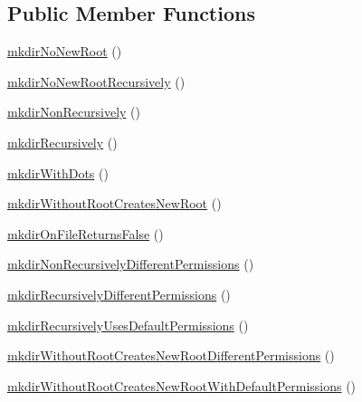 \subsection*{Public Member Functions}
\begin{DoxyCompactItemize}
\item 
\mbox{\hyperlink{classorg_1_1bovigo_1_1vfs_1_1vfs_stream_wrapper_mk_dir_test_case_a472b512da7f1358d4f03243da47422d0}{mkdir\+No\+New\+Root}} ()
\item 
\mbox{\hyperlink{classorg_1_1bovigo_1_1vfs_1_1vfs_stream_wrapper_mk_dir_test_case_af42ce413312ca7c8dc4a598ba148a31a}{mkdir\+No\+New\+Root\+Recursively}} ()
\item 
\mbox{\hyperlink{classorg_1_1bovigo_1_1vfs_1_1vfs_stream_wrapper_mk_dir_test_case_aa77ed864b8ff415a8d88597d8850232c}{mkdir\+Non\+Recursively}} ()
\item 
\mbox{\hyperlink{classorg_1_1bovigo_1_1vfs_1_1vfs_stream_wrapper_mk_dir_test_case_aae14c6d5af61495c3146496273a27914}{mkdir\+Recursively}} ()
\item 
\mbox{\hyperlink{classorg_1_1bovigo_1_1vfs_1_1vfs_stream_wrapper_mk_dir_test_case_a03f712ed8ee4cb7f24db9801ca8ca20e}{mkdir\+With\+Dots}} ()
\item 
\mbox{\hyperlink{classorg_1_1bovigo_1_1vfs_1_1vfs_stream_wrapper_mk_dir_test_case_a8878b08f86ffed3025203c9ab270905c}{mkdir\+Without\+Root\+Creates\+New\+Root}} ()
\item 
\mbox{\hyperlink{classorg_1_1bovigo_1_1vfs_1_1vfs_stream_wrapper_mk_dir_test_case_a65e6c6241ad1b790f552b5e5e78061b9}{mkdir\+On\+File\+Returns\+False}} ()
\item 
\mbox{\hyperlink{classorg_1_1bovigo_1_1vfs_1_1vfs_stream_wrapper_mk_dir_test_case_a0f791364308bfc16126fb0913fd917e2}{mkdir\+Non\+Recursively\+Different\+Permissions}} ()
\item 
\mbox{\hyperlink{classorg_1_1bovigo_1_1vfs_1_1vfs_stream_wrapper_mk_dir_test_case_a523c3194f3b232d82414e620e858cb3d}{mkdir\+Recursively\+Different\+Permissions}} ()
\item 
\mbox{\hyperlink{classorg_1_1bovigo_1_1vfs_1_1vfs_stream_wrapper_mk_dir_test_case_ac7affcd82d4f6e10711bb17db3107b5d}{mkdir\+Recursively\+Uses\+Default\+Permissions}} ()
\item 
\mbox{\hyperlink{classorg_1_1bovigo_1_1vfs_1_1vfs_stream_wrapper_mk_dir_test_case_a565169f1041afb44b5a365c37c9ffa2d}{mkdir\+Without\+Root\+Creates\+New\+Root\+Different\+Permissions}} ()
\item 
\mbox{\hyperlink{classorg_1_1bovigo_1_1vfs_1_1vfs_stream_wrapper_mk_dir_test_case_a5a0c6d1d4706bf9696eb6a654d00e309}{mkdir\+Without\+Root\+Creates\+New\+Root\+With\+Default\+Permissions}} ()

\end{DoxyCompactItemize}
